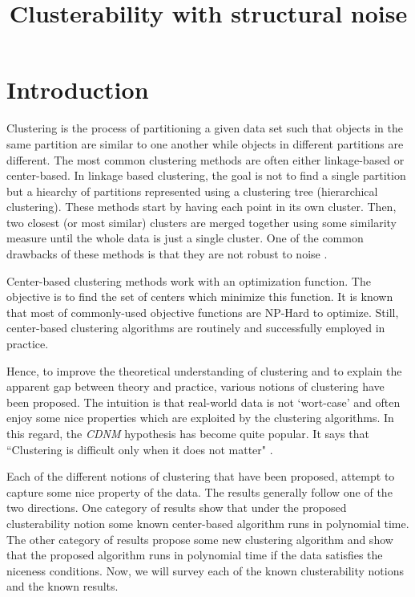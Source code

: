 \documentclass[twoside]{article}
\title{\LARGE Clusterability with structural noise}
\author{}
\begin{document}
\maketitle


\begin{abstract}
\end{abstract}
\section{Introduction}
Clustering is the process of partitioning a given data set such that objects in the same partition are similar to one another while objects in different partitions are different. The most common clustering methods are often either linkage-based or center-based. In linkage based clustering, the goal is not to find a single partition but a hiearchy of partitions represented using a clustering tree (hierarchical clustering). These methods start by having each point in its own cluster. Then, two closest (or most similar) clusters are merged together using some similarity measure until the whole data is just a single cluster. One of the common drawbacks of these methods is that they are not robust to noise \cite{narasimhan2005q}. 

Center-based clustering methods work with an optimization function. The objective is to find the set of centers which minimize this function. It is known that most of commonly-used objective functions are NP-Hard to optimize. Still, center-based clustering algorithms are routinely and successfully employed in practice.

Hence, to improve the theoretical understanding of clustering and to explain the apparent gap between theory and practice, various notions of clustering have been proposed. The intuition is that real-world data is not `wort-case' and often enjoy some nice properties which are exploited by the clustering algorithms. In this regard, the \emph{CDNM} hypothesis has become quite popular. It says that ``Clustering is difficult only when it does not matter" \cite{daniely2012clustering}.    

Each of the different notions of clustering that have been proposed, attempt to capture some nice property of the data. The results generally follow one of the two directions. One category of results show that under the proposed clusterability notion some known center-based algorithm runs in polynomial time. The other category of results propose some new clustering algorithm and show that the proposed algorithm runs in polynomial time if the data satisfies the niceness conditions. Now, we will survey each of the known clusterability notions and the known results.
\end{document}
